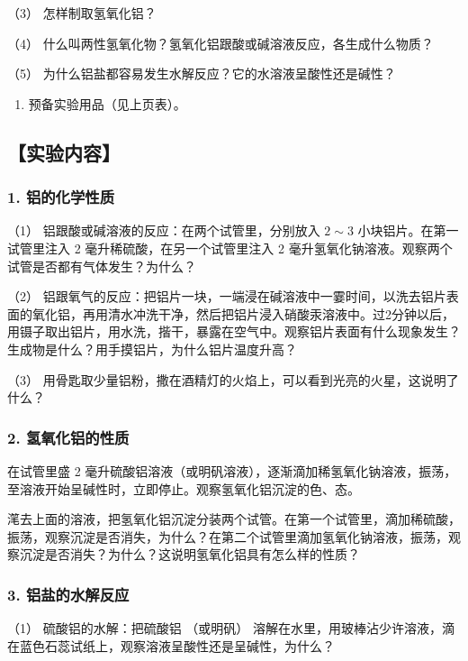 （3） 怎样制取氢氧化铝？

（4） 什么叫两性氢氧化物？氢氧化铝跟酸或碱溶液反应，各生成什么物质？

（5） 为什么铝盐都容易发生水解反应？它的水溶液呈酸性还是碱性？

\begin{enumerate}[start=2]
\item
  预备实验用品（见上页表）。
\end{enumerate}

\subsection{【实验内容】}

\subsubsection{1. 铝的化学性质}

（1） 铝跟酸或碱溶液的反应：在两个试管里，分别放入 \(2 \sim 3\)
小块铝片。在第一试管里注入 2 毫升稀硫酸，在另一个试管里注入 2
毫升氢氧化钠溶液。观察两个试管是否都有气体发生？为什么？

（2）
铝跟氧气的反应：把铝片一块，一端浸在碱溶液中一霎时间，以洗去铝片表面的氧化铝，再用清水冲洗干净，然后把铝片浸入硝酸汞溶液中。过2分钟以后，用镊子取出铝片，用水洗，揩干，暴露在空气中。观察铝片表面有什么现象发生？生成物是什么？用手摸铝片，为什么铝片温度升高？

（3）
用骨匙取少量铝粉，撒在酒精灯的火焰上，可以看到光亮的火星，这说明了什么？

\subsubsection{2. 氢氧化铝的性质}

在试管里盛 2
毫升硫酸铝溶液（或明矾溶液），逐渐滴加稀氢氧化钠溶液，振荡，至溶液开始呈碱性时，立即停止。观察氢氧化铝沉淀的色、态。

滗去上面的溶液，把氢氧化铝沉淀分装两个试管。在第一个试管里，滴加稀硫酸，振荡，观察沉淀是否消失，为什么？在第二个试管里滴加氢氧化钠溶液，振荡，观察沉淀是否消失？为什么？这说明氢氧化铝具有怎么样的性质？

\subsubsection{3. 铝盐的水解反应}

（1） 硫酸铝的水解：把硫酸铝 （或明矾）
溶解在水里，用玻棒沾少许溶液，滴在蓝色石蕊试纸上，观察溶液呈酸性还是呈碱性，为什么？

